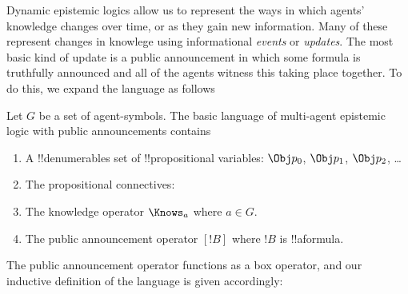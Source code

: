 \documentclass[../../../include/open-logic-section]{subfiles}
\begin{document}


Dynamic epistemic logics allow us to represent the ways in which
agents' knowledge changes over time, or as they gain new information.
Many of these represent changes in knowlege using informational
\emph{events} or \emph{updates}. The most basic kind of update is a
public announcement in which some formula is truthfully announced and
all of the agents witness this taking place together. To do this, we
expand the language as follows

\begin{defn}
Let $G$ be a set of agent-symbols. The basic language of multi-agent
epistemic logic with public announcements contains
\begin{enumerate}
  \item A !!{denumerable}s set of !!{propositional variable}s: $\Obj
    p_0$, $\Obj p_1$, $\Obj p_2$, \dots
  \item The propositional connectives: \startycommalist
  \item The knowledge operator $\Knows_a$ where $a \in G$.
  \item The public announcement operator $[!B]$ where $!B$ is !!a{formula}.
\end{enumerate}
\end{defn}

The public announcement operator functions as a box operator, and our
inductive definition of the language is given accordingly:
\end{document}
